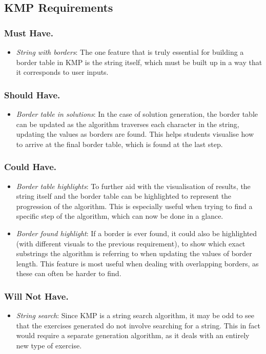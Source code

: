 \documentclass{l4proj}
\begin{document}
\subsection{KMP Requirements}
\subsubsection{Must Have.}
\begin{itemize}
	\item
	\emph{String with borders}: The one feature that is truly essential for building a border table in KMP is the string itself, which must be built up in a way that it corresponds to user inputs.
\end{itemize}
\subsubsection{Should Have.}
\begin{itemize}
	\item
	\emph{Border table in solutions}: In the case of solution generation, the border table can be updated as the algorithm traverses each character in the string, updating the values as borders are found. This helps students visualise how to arrive at the final border table, which is found at the last step.
\end{itemize}
\subsubsection{Could Have.}
\begin{itemize}
	\item
	\emph{Border table highlights}: To further aid with the visualisation of results, the string itself and the border table can be highlighted to represent the progression of the algorithm. This is especially useful when trying to find a specific step of the algorithm, which can now be done in a glance.
	\item
	\emph{Border found highlight}: If a border is ever found, it could also be highlighted (with different visuals to the previous requirement), to show which exact substrings the algorithm is referring to when updating the values of border length. This feature is most useful when dealing with overlapping borders, as these can often be harder to find.
 \end{itemize}
\subsubsection{Will Not Have.}
\begin{itemize}
	\item
	\emph{String search}: Since KMP is a string search algorithm, it may be odd to see that the exercises generated do not involve searching for a string. This in fact would require a separate generation algorithm, as it deals with an entirely new type of exercise.
\end{itemize}
\end{document}
